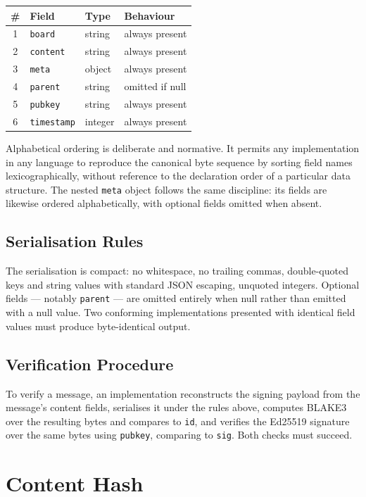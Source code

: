 \documentclass[11pt,a4paper]{article}
\begin{document}
\begin{longtable}{@{}clll@{}}
\toprule
\textbf{\#} & \textbf{Field} & \textbf{Type} & \textbf{Behaviour} \\
\midrule
1 & \texttt{board} & string & always present \\
2 & \texttt{content} & string & always present \\
3 & \texttt{meta} & object & always present \\
4 & \texttt{parent} & string & omitted if null \\
5 & \texttt{pubkey} & string & always present \\
6 & \texttt{timestamp} & integer & always present \\
\bottomrule
\end{longtable}

Alphabetical ordering is deliberate and normative. It permits any implementation in any language to reproduce the canonical byte sequence by sorting field names lexicographically, without reference to the declaration order of a particular data structure. The nested \texttt{meta} object follows the same discipline: its fields are likewise ordered alphabetically, with optional fields omitted when absent.

\subsection{Serialisation Rules}

The serialisation is compact: no whitespace, no trailing commas, double-quoted keys and string values with standard JSON escaping, unquoted integers. Optional fields --- notably \texttt{parent} --- are omitted entirely when null rather than emitted with a null value. Two conforming implementations presented with identical field values must produce byte-identical output.

\subsection{Verification Procedure}

To verify a message, an implementation reconstructs the signing payload from the message's content fields, serialises it under the rules above, computes BLAKE3 over the resulting bytes and compares to \texttt{id}, and verifies the Ed25519 signature over the same bytes using \texttt{pubkey}, comparing to \texttt{sig}. Both checks must succeed.

\section{Content Hash}
\end{document}
